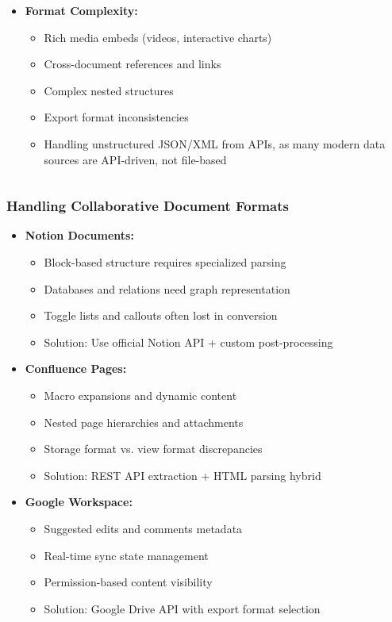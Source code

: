 \begin{frame}[fragile]
\begin{columns}
\begin{column}[T]{0.5\linewidth}
\begin{itemize}
        \item \textbf{Format Complexity:}
        \begin{itemize}
            \item Rich media embeds (videos, interactive charts)
            \item Cross-document references and links
            \item Complex nested structures
            \item Export format inconsistencies
			\item Handling unstructured JSON/XML from APIs, as many modern data sources are API-driven, not file-based
        \end{itemize}
      \end{itemize}
    \end{column}
\end{columns}
\end{frame}

\begin{frame}[fragile]\frametitle{Handling Collaborative Document Formats}
      \begin{itemize}
        \item \textbf{Notion Documents:}
        \begin{itemize}
            \item Block-based structure requires specialized parsing
            \item Databases and relations need graph representation
            \item Toggle lists and callouts often lost in conversion
            \item Solution: Use official Notion API + custom post-processing
        \end{itemize}
        \item \textbf{Confluence Pages:}
        \begin{itemize}
            \item Macro expansions and dynamic content
            \item Nested page hierarchies and attachments
            \item Storage format vs. view format discrepancies
            \item Solution: REST API extraction + HTML parsing hybrid
        \end{itemize}
        \item \textbf{Google Workspace:}
        \begin{itemize}
            \item Suggested edits and comments metadata
            \item Real-time sync state management
            \item Permission-based content visibility
            \item Solution: Google Drive API with export format selection
        \end{itemize}
      \end{itemize}
\end{frame}

